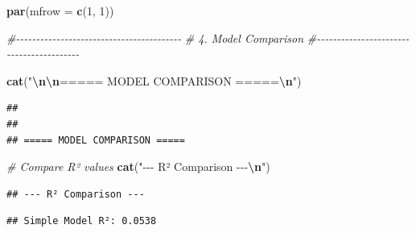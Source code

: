 \documentclass[
  12pt,
]{article}
\newenvironment{Shaded}{\begin{snugshade}}{\end{snugshade}}
\newcommand{\AttributeTok}[1]{\textcolor[rgb]{0.13,0.29,0.53}{#1}}
\newcommand{\CommentTok}[1]{\textcolor[rgb]{0.56,0.35,0.01}{\textit{#1}}}
\newcommand{\DecValTok}[1]{\textcolor[rgb]{0.00,0.00,0.81}{#1}}
\newcommand{\FunctionTok}[1]{\textcolor[rgb]{0.13,0.29,0.53}{\textbf{#1}}}
\newcommand{\NormalTok}[1]{#1}
\newcommand{\SpecialCharTok}[1]{\textcolor[rgb]{0.81,0.36,0.00}{\textbf{#1}}}
\newcommand{\StringTok}[1]{\textcolor[rgb]{0.31,0.60,0.02}{#1}}
\begin{document}
\begin{Shaded}
\begin{Highlighting}[]
\FunctionTok{par}\NormalTok{(}\AttributeTok{mfrow =} \FunctionTok{c}\NormalTok{(}\DecValTok{1}\NormalTok{, }\DecValTok{1}\NormalTok{))}

\CommentTok{\#{-}{-}{-}{-}{-}{-}{-}{-}{-}{-}{-}{-}{-}{-}{-}{-}{-}{-}{-}{-}{-}{-}{-}{-}{-}{-}{-}{-}{-}{-}{-}{-}{-}{-}{-}{-}{-}{-}{-}{-}{-}}
\CommentTok{\# 4. Model Comparison}
\CommentTok{\#{-}{-}{-}{-}{-}{-}{-}{-}{-}{-}{-}{-}{-}{-}{-}{-}{-}{-}{-}{-}{-}{-}{-}{-}{-}{-}{-}{-}{-}{-}{-}{-}{-}{-}{-}{-}{-}{-}{-}{-}{-}}

\FunctionTok{cat}\NormalTok{(}\StringTok{"}\SpecialCharTok{\textbackslash{}n\textbackslash{}n}\StringTok{===== MODEL COMPARISON =====}\SpecialCharTok{\textbackslash{}n}\StringTok{"}\NormalTok{)}
\end{Highlighting}
\end{Shaded}

\begin{verbatim}
## 
## 
## ===== MODEL COMPARISON =====
\end{verbatim}

\begin{Shaded}
\begin{Highlighting}[]
\CommentTok{\# Compare R² values}
\FunctionTok{cat}\NormalTok{(}\StringTok{"{-}{-}{-} R² Comparison {-}{-}{-}}\SpecialCharTok{\textbackslash{}n}\StringTok{"}\NormalTok{)}
\end{Highlighting}
\end{Shaded}

\begin{verbatim}
## --- R² Comparison ---
\end{verbatim}

\begin{Shaded}
\end{Shaded}

\begin{verbatim}
## Simple Model R²: 0.0538
\end{verbatim}

\begin{Shaded}
\end{Shaded}
\end{document}
